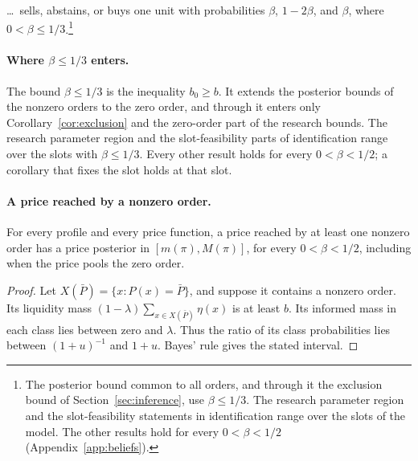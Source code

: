 
\noindent\ldots\ sells, abstains, or buys one unit with probabilities \(\beta\), \(1-2\beta\), and \(\beta\), where
\(0<\beta\le1/3\).\footnote{The posterior bound common to all orders, and through it the exclusion bound of
Section~\ref{sec:inference}, use \(\beta\le1/3\). The research parameter region and the slot-feasibility statements
in identification range over the slots of the model. The other results hold for every \(0<\beta<1/2\)
(Appendix~\ref{app:beliefs}).}

\paragraph{Where \(\beta\le1/3\) enters.}
The bound \(\beta\le1/3\) is the inequality \(b_0\ge b\). It extends the posterior bounds of the nonzero orders
to the zero order, and through it enters only Corollary~\ref{cor:exclusion} and the zero-order part of the
research bounds. The research parameter region and the slot-feasibility parts of identification range over the
slots with \(\beta\le1/3\). Every other result holds for every \(0<\beta<1/2\); a corollary that fixes the slot
holds at that slot.

\paragraph{A price reached by a nonzero order.}
For every profile and every price function, a price reached by at least one nonzero order has a price posterior
in \([m(\pi),M(\pi)]\), for every \(0<\beta<1/2\), including when the price pools the zero order.

\begin{proof}
Let \(X(\bar P)=\{x:P(x)=\bar P\}\), and suppose it contains a nonzero order. Its liquidity mass
\((1-\lambda)\sum_{x\in X(\bar P)}\eta(x)\) is at least \(b\). Its informed mass in each class lies between zero
and \(\lambda\). Thus the ratio of its class probabilities lies between \((1+u)^{-1}\) and \(1+u\). Bayes' rule
gives the stated interval.

\end{proof}

